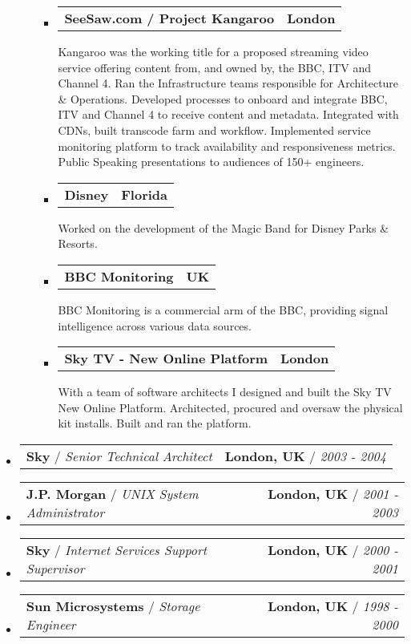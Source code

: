 \documentclass[10pt,a4paper]{article}
\makeatletter
\newcommand{\headerrow}[2]
{\begin{tabular*}{\linewidth}{l@{\extracolsep{\fill}}r}
	#1 &
	#2 \\
\end{tabular*}}
\makeatother
\begin{document}
\begin{itemize}
\begin{itemize}
\begin{itemize}
					\item
          \headerrow
              {\textbf{SeeSaw.com / Project Kangaroo}}
              {\textbf{London}}
              Kangaroo was the working title for a proposed streaming video service offering content from, and owned by, the BBC, ITV and Channel 4. Ran the Infrastructure teams responsible for Architecture \& Operations. Developed processes to onboard and integrate BBC, ITV and Channel 4 to receive content and metadata. Integrated with CDNs, built transcode farm and workflow. Implemented service monitoring platform to track availability and responsiveness metrics.  Public Speaking presentations to audiences of 150+ engineers.

					\item
          \headerrow
              {\textbf{Disney}}
              {\textbf{Florida}}
              Worked on the development of the Magic Band for Disney Parks \& Resorts.

					\item
          \headerrow
              {\textbf{BBC Monitoring}}
              {\textbf{UK}}
              BBC Monitoring is a commercial arm of the BBC, providing signal intelligence across various data sources.

				\item
				\headerrow
						{\textbf{Sky TV - New Online Platform}}
						{\textbf{London}}
						With a team of software architects I designed and built the Sky TV New Online Platform.  Architected, procured and oversaw the physical kit installs.  Built and ran the platform.

			\end{itemize}
      \end{itemize}

	\item[]
	\headerrow
    {\textbf{Sky} / \emph{Senior Technical Architect}}
    {\textbf{London, UK} / \emph{2003 - 2004}}

	\item[]
	\headerrow
    {\textbf{J.P. Morgan} / \emph{UNIX System Administrator}}
    {\textbf{London, UK} / \emph{2001 - 2003}}

	\item[]
	\headerrow
    {\textbf{Sky} / \emph{Internet Services Support Supervisor}}
    {\textbf{London, UK} / \emph{2000 - 2001}}

	\item[]
	\headerrow
    {\textbf{Sun Microsystems} / \emph{Storage Engineer}}
    {\textbf{London, UK} / \emph{1998 - 2000}}

\end{itemize}
\end{document}
